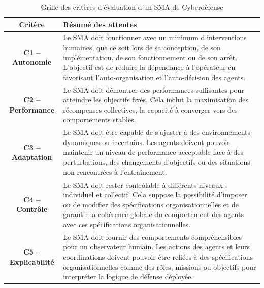 \begin{table}[H]
  \centering
  \caption{Grille des critères d'évaluation d'un SMA de Cyberdéfense}
  \label{tab:critere_aica}
  \small
  \renewcommand{\arraystretch}{1.2}
  \begin{tabular}{cp{11cm}}
    \hline
    \textbf{Critère}             & \textbf{Résumé des attentes}                                                                                                                                                                                                                                                                 \\
    \hline
    \textbf{C1 -- Autonomie}     & Le SMA doit fonctionner avec un minimum d'interventions humaines, que ce soit lors de sa conception, de son implémentation, de son fonctionnement ou de son arrêt. L'objectif est de réduire la dépendance à l'opérateur en favorisant l'auto-organisation et l'auto-décision des agents.    \\

    \textbf{C2 -- Performance}   & Le SMA doit démontrer des performances suffisantes pour atteindre les objectifs fixés. Cela inclut la maximisation des récompenses collectives, la capacité à converger vers des comportements stables.                                                                                      \\

    \textbf{C3 -- Adaptation}    & Le SMA doit être capable de s'ajuster à des environnements dynamiques ou incertains. Les agents doivent pouvoir maintenir un niveau de performance acceptable face à des perturbations, des changements d'objectifs ou des situations non rencontrées à l'entraînement.                      \\

    \textbf{C4 -- Contrôle}      & Le SMA doit rester contrôlable à différents niveaux : individuel et collectif. Cela suppose la possibilité d'imposer ou de modifier des spécifications organisationnelles et de garantir la cohérence globale du comportement des agents avec ces spécifications organisationnelles.         \\

    \textbf{C5 -- Explicabilité} & Le SMA doit fournir des comportements compréhensibles pour un observateur humain. Les actions des agents et leurs coordinations doivent pouvoir être reliées à des spécifications organisationnelles comme des rôles, missions ou objectifs pour interpréter la logique de défense déployée. \\
    \hline
  \end{tabular}
\end{table}


